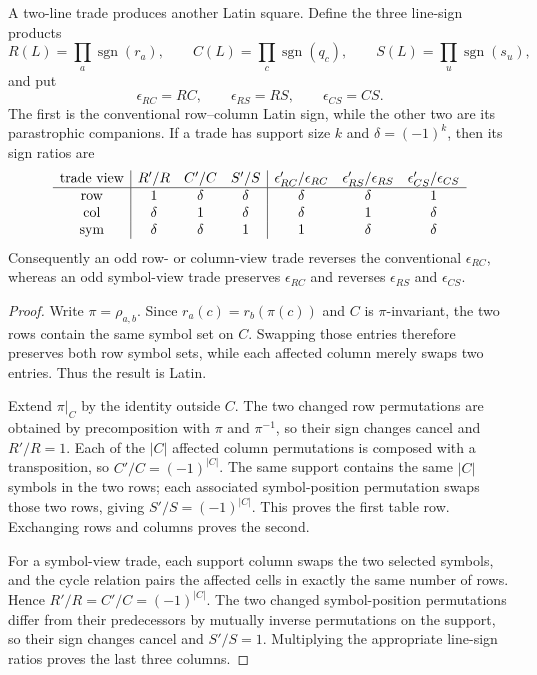 \begin{proposition}\label{prop:trade}
A two-line trade produces another Latin square.  Define the three line-sign
products
\[
 R(L)=\prod_a\operatorname{sgn}(r_a),\qquad
 C(L)=\prod_c\operatorname{sgn}(q_c),\qquad
 S(L)=\prod_u\operatorname{sgn}(s_u),
\]
and put
\[
 \epsilon_{RC}=RC,\qquad \epsilon_{RS}=RS,\qquad \epsilon_{CS}=CS.
\]
The first is the conventional row--column Latin sign, while the other two
are its parastrophic companions.  If a trade has support size $k$ and
$\delta=(-1)^k$, then its sign ratios are
\[
\begin{array}{c|ccc|ccc}
\text{trade view} & R'/R&C'/C&S'/S&
 \epsilon'_{RC}/\epsilon_{RC}&\epsilon'_{RS}/\epsilon_{RS}&
 \epsilon'_{CS}/\epsilon_{CS}\\
\hline
\mathrm{row}    &1&\delta&\delta&\delta&\delta&1\\
\mathrm{col}    &\delta&1&\delta&\delta&1&\delta\\
\mathrm{sym}    &\delta&\delta&1&1&\delta&\delta
\end{array}
\]
Consequently an odd row- or column-view trade reverses the conventional
$\epsilon_{RC}$, whereas an odd symbol-view trade preserves $\epsilon_{RC}$
and reverses $\epsilon_{RS}$ and $\epsilon_{CS}$.
\end{proposition}

\begin{proof}
Write $\pi=\rho_{a,b}$.  Since $r_a(c)=r_b(\pi(c))$ and $C$ is
$\pi$-invariant, the two rows contain the same symbol set on $C$.  Swapping
those entries therefore preserves both row symbol sets, while each affected
column merely swaps two entries.  Thus the result is Latin.

Extend $\pi|_C$ by the identity outside $C$.  The two changed row
permutations are obtained by precomposition with $\pi$ and $\pi^{-1}$, so
their sign changes cancel and $R'/R=1$.  Each of the $|C|$ affected column
permutations is composed with a transposition, so $C'/C=(-1)^{|C|}$.  The
same support contains the same $|C|$ symbols in the two rows; each associated
symbol-position permutation swaps those two rows, giving
$S'/S=(-1)^{|C|}$.  This proves the first table row.  Exchanging rows and
columns proves the second.

For a symbol-view trade, each support column swaps the two selected symbols,
and the cycle relation pairs the affected cells in exactly the same number of
rows.  Hence $R'/R=C'/C=(-1)^{|C|}$.  The two changed symbol-position
permutations differ from their predecessors by mutually inverse
permutations on the support, so their sign changes cancel and $S'/S=1$.
Multiplying the appropriate line-sign ratios proves the last three columns.
\end{proof}

